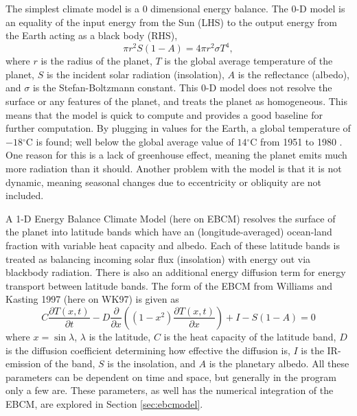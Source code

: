 \documentclass[12pt, onecolumn]{revtex4-2}    %
\newcommand{\degrees}{\ensuremath{^{\circ}}}
\begin{document}
The simplest climate model is a 0 dimensional energy balance.
The 0-D model is an equality of the input energy from the Sun (LHS) to the output energy from the Earth acting as a black body (RHS),
\begin{equation}
    \pi r^2 S(1-A) = 4 \pi r^2 \sigma T^4, \label{eq:0DEBCM}
\end{equation}
where $r$ is the radius of the planet, $T$ is the global average temperature of the planet, $S$ is the incident solar radiation (insolation), $A$ is the reflectance (albedo), and $\sigma$ is the Stefan-Boltzmann constant.
This 0-D model does not resolve the surface or any features of the planet, and treats the planet as homogeneous.
This means that the model is quick to compute and provides a good baseline for further computation.
By plugging in values for the Earth, a global temperature of $-18\degrees$C is found; well below the global average value of $14\degrees$C from 1951 to 1980 \cite{NASAGlobTemp}.
One reason for this is a lack of greenhouse effect, meaning the planet emits much more radiation than it should.
Another problem with the model is that it is not dynamic, meaning seasonal changes due to eccentricity or obliquity are not included.

A 1-D Energy Balance Climate Model (here on EBCM) resolves the surface of the planet into latitude bands which have an (longitude-averaged) ocean-land fraction with variable heat capacity and albedo.
Each of these latitude bands is treated as balancing incoming solar flux (insolation) with energy out via blackbody radiation.
There is also an additional energy diffusion term for energy transport between latitude bands.
The form of the EBCM from Williams and Kasting 1997 (here on WK97) is given as
\begin{equation}
    C\frac{\partial T(x, t)}{\partial t} - D \frac{\partial}{\partial x} \left((1-x^2)\frac{\partial T(x, t)}{\partial x}\right) + I - S(1-A) = 0
    \label{eq:PDE_in_x}
\end{equation}
where $x=\sin\lambda$, $\lambda$ is the latitude, $C$ is the heat capacity of the latitude band,
$D$ is the diffusion coefficient determining how effective the diffusion is, $I$ is the IR-emission of the band,
$S$ is the insolation, and $A$ is the planetary albedo.
All these parameters can be dependent on time and space, but generally in the program only a few are.
These parameters, as well has the numerical integration of the EBCM, are explored in Section \ref{sec:ebcmodel}.
\end{document}
